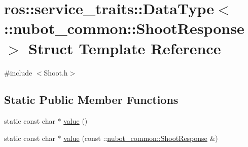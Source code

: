 \hypertarget{structros_1_1service__traits_1_1DataType_3_01_1_1nubot__common_1_1ShootResponse_01_4}{\section{ros\-:\-:service\-\_\-traits\-:\-:Data\-Type$<$ \-:\-:nubot\-\_\-common\-:\-:Shoot\-Response $>$ Struct Template Reference}
\label{structros_1_1service__traits_1_1DataType_3_01_1_1nubot__common_1_1ShootResponse_01_4}
}


{\ttfamily \#include $<$Shoot.\-h$>$}

\subsection*{Static Public Member Functions}
\begin{DoxyCompactItemize}
\item 
static const char $\ast$ \hyperlink{structros_1_1service__traits_1_1DataType_3_01_1_1nubot__common_1_1ShootResponse_01_4_ae4be57afd5579dfe306f6bcec25c1784}{value} ()
\item 
static const char $\ast$ \hyperlink{structros_1_1service__traits_1_1DataType_3_01_1_1nubot__common_1_1ShootResponse_01_4_a36681cd1c143749048dc7a12a0c2bca8}{value} (const \-::\hyperlink{namespacenubot__common_a1561f4f368f1842d112eda1c185772d4}{nubot\-\_\-common\-::\-Shoot\-Response} \&)
\end{DoxyCompactItemize}



